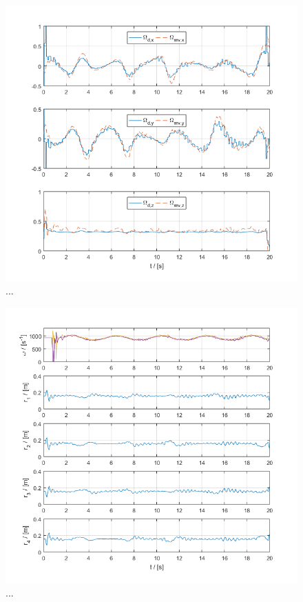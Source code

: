 \begin{figure}[h!]
	\centering
	\includegraphics[width=\columnwidth]{./pictures/mmc_traj_omega.png}
	\caption{...}
	\label{fig:traj_omega}
\end{figure}

\begin{figure}[h!]
	\centering
	\includegraphics[width=\columnwidth]{./pictures/mmc_traj_rotorVel_massOff.png}
	\caption{...}
	\label{fig:rotorVel_massOff}
\end{figure}

